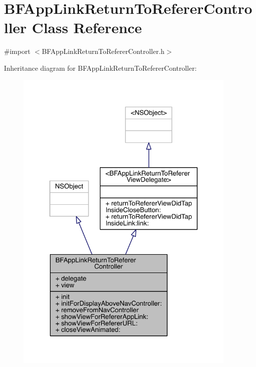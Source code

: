 \hypertarget{interface_b_f_app_link_return_to_referer_controller}{\section{B\-F\-App\-Link\-Return\-To\-Referer\-Controller Class Reference}
\label{interface_b_f_app_link_return_to_referer_controller}
}


{\ttfamily \#import $<$B\-F\-App\-Link\-Return\-To\-Referer\-Controller.\-h$>$}



Inheritance diagram for B\-F\-App\-Link\-Return\-To\-Referer\-Controller\-:
\nopagebreak
\begin{figure}[H]
\begin{center}
\leavevmode
\includegraphics[width=303pt]{interface_b_f_app_link_return_to_referer_controller__inherit__graph}
\end{center}
\end{figure}



